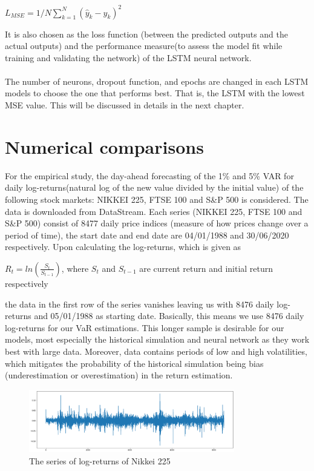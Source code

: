 \documentclass[a4paper,11pt,oneside]{book}
\begin{document}
\begin{center}
	$L_{MSE} = 1/N\sum_{k=1}^{N} ({\hat{y}}_{k}-y_k)^2$
\end{center}
It is also chosen as the loss function (between the predicted outputs and the actual outputs) and the performance measure(to assess the model fit while
training and validating the network) of the
LSTM neural network.\\\\


The number of neurons, dropout function, and epochs are changed in each LSTM models to choose the one that performs best. That is, the LSTM with the lowest MSE value. This will be discussed in details in the next chapter.


\chapter{Numerical comparisons}
For the empirical study, the day-ahead forecasting of the 1\% and 5\% VAR for daily log-returns(natural log of the new value divided by the initial value) of the following stock markets: NIKKEI 225, FTSE 100 and S\&P 500 is considered. The data is downloaded from DataStream. Each series (NIKKEI 225, FTSE 100 and S\&P 500) consist of 8477 daily price indices (measure of how prices change over a period of time), the start date and end date are 04/01/1988 and 30/06/2020 respectively. Upon calculating the log-returns, which is given as 

\begin{center}
	$R_t = ln(\frac{S_t}{S_{t-1}})$, where ${S_t}$ and ${S_{t-1}}$ are current return and initial return respectively
\end{center}
the data in the first row of the series vanishes leaving us with 8476 daily log-returns and 05/01/1988 as starting date. Basically, this means we use 8476 daily log-returns for our VaR estimations. This longer sample is desirable for our models, most especially the historical simulation and neural network as they work best with large data. Moreover, data contains periods of low and high volatilities, which mitigates the probability of the historical simulation being bias (underestimation or overestimation) in the return estimation.\newline

\begin{figure}[!h]
	\centering
	\includegraphics[width=0.8\textwidth]{figures/logNikkei}
	\caption{The series of log-returns of Nikkei 225}
	\label{logNikkei}
\end{figure}
\end{document}
